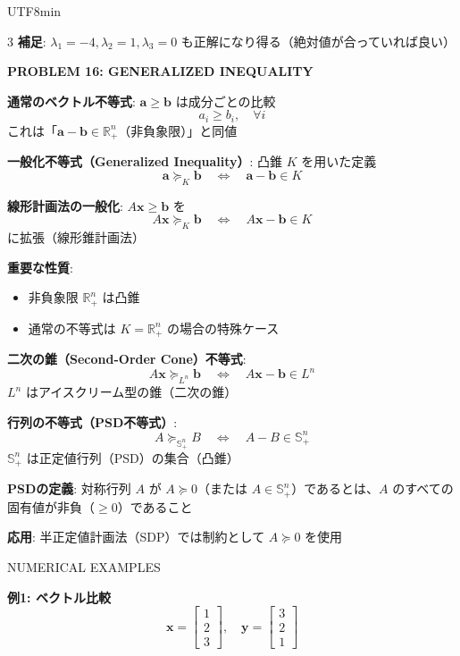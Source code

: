 \documentclass[8pt,a4paper]{article}
\newcommand{\mysection}[1]{\vspace{2pt}\textbf{#1}\vspace{1pt}}
\begin{document}
\begin{CJK}{UTF8}{min}
\begin{multicols}{3}
\textbf{補足}: $\lambda_1=-4, \lambda_2=1, \lambda_3=0$ も正解になり得る（絶対値が合っていれば良い）

\mysection{PROBLEM 16: GENERALIZED INEQUALITY}

\textbf{通常のベクトル不等式}: $\boldsymbol{a} \geq \boldsymbol{b}$ は成分ごとの比較
\[
a_i \geq b_i, \quad \forall i
\]
これは「$\boldsymbol{a} - \boldsymbol{b} \in \mathbb{R}_+^n$（非負象限）」と同値

\textbf{一般化不等式（Generalized Inequality）}: 凸錐 $K$ を用いた定義
\[
\boldsymbol{a} \succeq_K \boldsymbol{b} \quad \Leftrightarrow \quad \boldsymbol{a} - \boldsymbol{b} \in K
\]

\textbf{線形計画法の一般化}: $A\boldsymbol{x} \geq \boldsymbol{b}$ を
\[
A\boldsymbol{x} \succeq_K \boldsymbol{b} \quad \Leftrightarrow \quad A\boldsymbol{x} - \boldsymbol{b} \in K
\]
に拡張（線形錐計画法）

\textbf{重要な性質}:
\begin{itemize}
    \item 非負象限 $\mathbb{R}_+^n$ は凸錐
    \item 通常の不等式は $K = \mathbb{R}_+^n$ の場合の特殊ケース
\end{itemize}

\textbf{二次の錐（Second-Order Cone）不等式}:
\[
A\boldsymbol{x} \succeq_{L^n} \boldsymbol{b} \quad \Leftrightarrow \quad A\boldsymbol{x} - \boldsymbol{b} \in L^n
\]
$L^n$ はアイスクリーム型の錐（二次の錐）

\textbf{行列の不等式（PSD不等式）}:
\[
A \succeq_{\mathbb{S}_+^n} B \quad \Leftrightarrow \quad A - B \in \mathbb{S}_+^n
\]
$\mathbb{S}_+^n$ は正定値行列（PSD）の集合（凸錐）

\textbf{PSDの定義}: 対称行列 $A$ が $A \succeq 0$（または $A \in \mathbb{S}_+^n$）であるとは、$A$ のすべての固有値が非負（$\geq 0$）であること

\textbf{応用}: 半正定値計画法（SDP）では制約として $A \succeq 0$ を使用

{NUMERICAL EXAMPLES}

\textbf{例1: ベクトル比較}
\[
\boldsymbol{x} = \begin{bmatrix} 1 \\ 2 \\ 3 \end{bmatrix}, \quad \boldsymbol{y} = \begin{bmatrix} 3 \\ 2 \\ 1 \end{bmatrix}
\]


\end{multicols}
\end{CJK}
\end{document}
